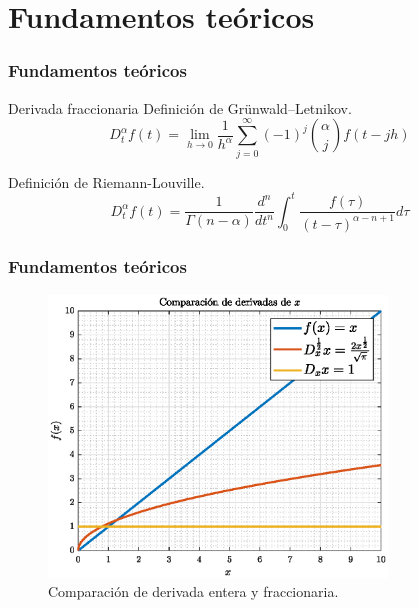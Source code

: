 \documentclass[10pt]{beamer}
\begin{document}
	\section{Fundamentos teóricos}
	\begin{frame}
		\frametitle{Fundamentos teóricos}
		\begin{block}{Derivada fraccionaria}
		Definición de Grünwald–Letnikov.
			\begin{equation}
				D^{\alpha}_{t} f(t) = \lim_{h \to 0} \frac{1}{h^{\alpha}}   \sum_{j = 0}^{\infty} (-1)^{j} \binom{\alpha}{j} f(t - jh)
			\end{equation}
			
		Definición de Riemann-Louville.
			\begin{equation}
				D^{\alpha}_{t} f(t) = \frac{1}{\Gamma(n-\alpha)} \frac{d^{n}}{dt^{n}} \int_{0}^{t} \frac{f(\tau)}{(t-\tau)^{\alpha -n +1}} d\tau
			\end{equation}
		\end{block}
	\end{frame}
	\begin{frame}
		\frametitle{Fundamentos teóricos}
		\begin{figure}[hbtp]
			\centering
			\includegraphics[width = 9cm]{A3_derivada_x.eps}
			\caption{Comparación de derivada entera y fraccionaria.}
		\end{figure}
	\end{frame}	
\end{document}
